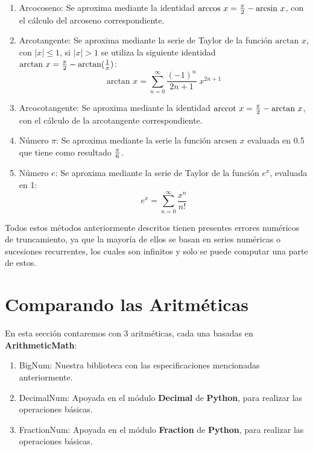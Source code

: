 \documentclass[a4paper,10pt,twocolumn]{article}
\begin{document}
\begin{enumerate}
  		\item Arcocoseno: Se aproxima mediante la identidad $\text{arccos }x={\pi \over 2}-\text{arcsin }x$, con el cálculo del arcoseno correspondiente.
  		
  		\item Arcotangente: Se aproxima mediante la serie de Taylor de la función $\text{arctan }x$, con $|x| \leq 1$, si $|x| > 1$ se utiliza la siguiente identidad $\text{arctan }x={\pi \over 2}-\text{arctan}({1 \over x})$:
  			\begin{equation}
  				\text{arctan }x=\sum _{n=0}^{\infty }{\frac {(-1)^{n}}{2n+1}}\;x^{2n+1}
  			\end{equation}
  			
  		\item Arcocotangente: Se aproxima mediante la identidad $\text{arccot }x={\pi \over 2}-\text{arctan }x$, con el cálculo de la arcotangente correspondiente.
  		
  		\item Número $\pi$: Se aproxima mediante la serie la función $\text{arcsen }x$ evaluada en 0.5 que tiene como resultado $\pi\over 6$.
  		
  		\item Número $e$: Se aproxima mediante la serie de Taylor de la función $e^x$, evaluada en 1:
  			\begin{equation}
  				e^{x}=\sum _{n=0}^{\infty }{\frac {x^{n}}{n!}}
  			\end{equation}
  	\end{enumerate}
  			
  	Todos estos métodos anteriormente descritos tienen presentes errores numéricos de truncamiento, ya que la mayoría de ellos se basan en series numéricas o sucesiones recurrentes, los cuales son infinitos y solo se puede computar una parte de estos.
	

\section{Comparando las Aritméticas}\label{sub:comp_aritmetics}
	En esta sección contaremos con 3 aritméticas, cada una basadas en \textbf{ArithmeticMath}:
	\begin{enumerate}
		\item BigNum: Nuestra biblioteca con las especificaciones mencionadas anteriormente.
		
		\item DecimalNum: Apoyada en el módulo \textbf{Decimal} de \textbf{Python}, para realizar las operaciones básicas.
		
		\item FractionNum: Apoyada en el módulo \textbf{Fraction} de \textbf{Python}, para realizar las operaciones básicas. 
	\end{enumerate}
\end{document}
